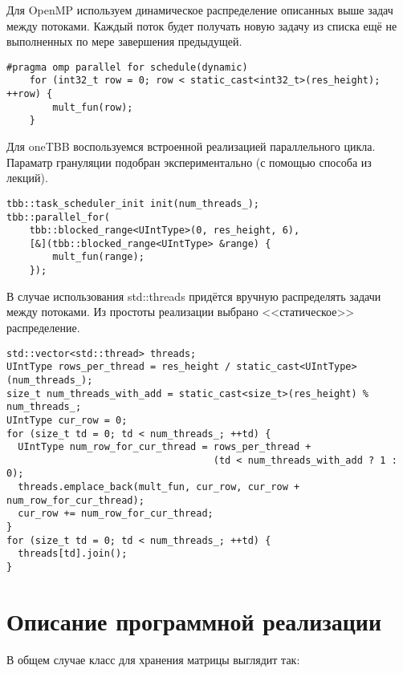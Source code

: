 \documentclass{report}
\begin{document}
Для OpenMP используем динамическое распределение описанных выше задач между потоками. Каждый поток будет получать новую задачу из списка ещё не выполненных по мере завершения предыдущей.
\begin{lstlisting}
#pragma omp parallel for schedule(dynamic)
    for (int32_t row = 0; row < static_cast<int32_t>(res_height); ++row) {
        mult_fun(row);
    }
\end{lstlisting}

Для oneTBB воспользуемся встроенной реализацией параллельного цикла. Параматр грануляции подобран экспериментально (с помощью способа из лекций).
\begin{lstlisting}
tbb::task_scheduler_init init(num_threads_);
tbb::parallel_for(
    tbb::blocked_range<UIntType>(0, res_height, 6),
    [&](tbb::blocked_range<UIntType> &range) {
        mult_fun(range);
    });
\end{lstlisting}

В случае использования std::threads придётся вручную распределять задачи между потоками. Из простоты реализации выбрано <<статическое>> распределение.
\begin{lstlisting}
std::vector<std::thread> threads;
UIntType rows_per_thread = res_height / static_cast<UIntType>(num_threads_);
size_t num_threads_with_add = static_cast<size_t>(res_height) % num_threads_;
UIntType cur_row = 0;
for (size_t td = 0; td < num_threads_; ++td) {
  UIntType num_row_for_cur_thread = rows_per_thread + 
                                    (td < num_threads_with_add ? 1 : 0);
  threads.emplace_back(mult_fun, cur_row, cur_row + num_row_for_cur_thread);
  cur_row += num_row_for_cur_thread;
}
for (size_t td = 0; td < num_threads_; ++td) {
  threads[td].join();
}
\end{lstlisting}

\newpage
\section*{Описание программной реализации}
В общем случае класс для хранения матрицы выглядит так:
\end{document}

